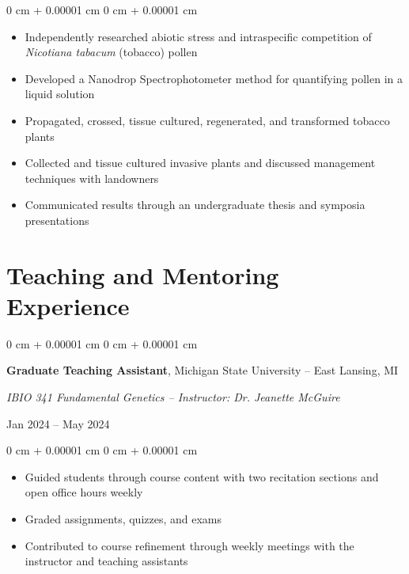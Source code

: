 \documentclass[10pt, letterpaper]{article}
\newenvironment{highlights}{
    \begin{itemize}[
        topsep=0.10 cm,
        parsep=0.10 cm,
        partopsep=0pt,
        itemsep=0pt,
        leftmargin=0 cm + 10pt
    ]
}{
    \end{itemize}
} %
\newenvironment{onecolentry}{
    \begin{adjustwidth}{
        0 cm + 0.00001 cm
    }{
        0 cm + 0.00001 cm
    }
}{
    \end{adjustwidth}
} %
\newenvironment{twocolentry}[2][]{
    \onecolentry
    \def\secondColumn{#2}
    \setcolumnwidth{\fill, 4.5 cm}
    \begin{paracol}{2}
}{
    \switchcolumn \raggedleft \secondColumn
    \end{paracol}
    \endonecolentry
} %
\begin{document}
        \begin{onecolentry}
            \begin{highlights}
                \item Independently researched abiotic stress and intraspecific competition of \textit{Nicotiana tabacum} (tobacco) pollen
                \item Developed a Nanodrop Spectrophotometer method for quantifying pollen in a liquid solution
                \item Propagated, crossed, tissue cultured, regenerated, and transformed tobacco plants
                \item Collected and tissue cultured invasive plants and discussed management techniques with landowners
                \item Communicated results through an undergraduate thesis and symposia presentations             
            \end{highlights}
        \end{onecolentry}




    \section{Teaching and Mentoring Experience}




        \begin{samepage} 
            \begin{twocolentry}{
                Jan 2024 – May 2024
                }
                \textbf{Graduate Teaching Assistant}, Michigan State University -- East Lansing, MI
                
                \vspace{0.05 cm}

                \textit{IBIO 341 Fundamental Genetics -- Instructor: Dr. Jeanette McGuire}
            \end{twocolentry}
        \end{samepage}  

        \vspace{0.10 cm}
        
        \begin{onecolentry}
            \begin{highlights}
                \item Guided students through course content with two recitation sections and open office hours weekly            
                \item Graded assignments, quizzes, and exams
                \item Contributed to course refinement through weekly meetings with the instructor and teaching assistants
            \end{highlights}
        \end{onecolentry}
\end{document}
